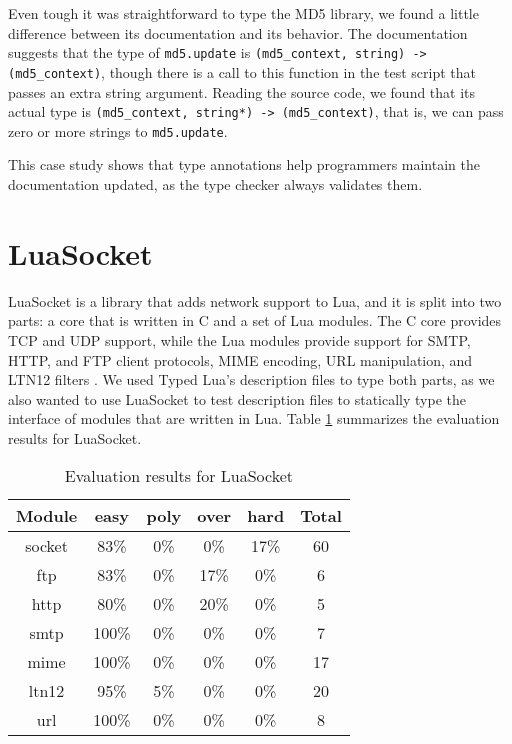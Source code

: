 Even tough it was straightforward to type the MD5 library,
we found a little difference between its documentation and its behavior.
The documentation suggests that the type of \texttt{md5.update}
is \texttt{(md5\string_context, string) -> (md5\string_context)},
though there is a call to this function in the test script that passes
an extra string argument.
Reading the source code, we found that its actual type is
\texttt{(md5\string_context, string*) -> (md5\string_context)},
that is, we can pass zero or more strings to \texttt{md5.update}.

This case study shows that type annotations help programmers maintain the
documentation updated, as the type checker always validates them.

\section{LuaSocket}

LuaSocket is a library that adds network support to Lua,
and it is split into two parts: a core that is written in C and a set of
Lua modules.
The C core provides TCP and UDP support, while the Lua modules provide
support for SMTP, HTTP, and FTP client protocols, MIME encoding,
URL manipulation, and LTN12 filters \cite{nehab2008ltn012}.
We used Typed Lua's description files to type both parts, as we also
wanted to use LuaSocket to test description files to statically type
the interface of modules that are written in Lua.
Table \ref{tab:evalsocket} summarizes the evaluation results for LuaSocket.

\begin{table}[!ht]
\begin{center}
\begin{tabular}{|c|c|c|c|c|c|}
\hline
\textbf{Module} & \textbf{easy} & \textbf{poly} & \textbf{over} & \textbf{hard} & \textbf{Total} \\
\hline
socket & 83\% & 0\% & 0\% & 17\% & 60 \\ %
\hline
ftp & 83\% & 0\% & 17\% & 0\% & 6 \\ %
\hline
http & 80\% & 0\% & 20\% & 0\% & 5 \\ %
\hline
smtp & 100\% & 0\% & 0\% & 0\% & 7 \\ %
\hline
mime & 100\% & 0\% & 0\% & 0\% & 17 \\ %
\hline
ltn12 & 95\% & 5\% & 0\% & 0\% & 20 \\ %
\hline
url & 100\% & 0\% & 0\% & 0\% & 8 \\ %
\hline
\end{tabular}
\end{center}
\caption{Evaluation results for LuaSocket}
\label{tab:evalsocket}
\end{table}


